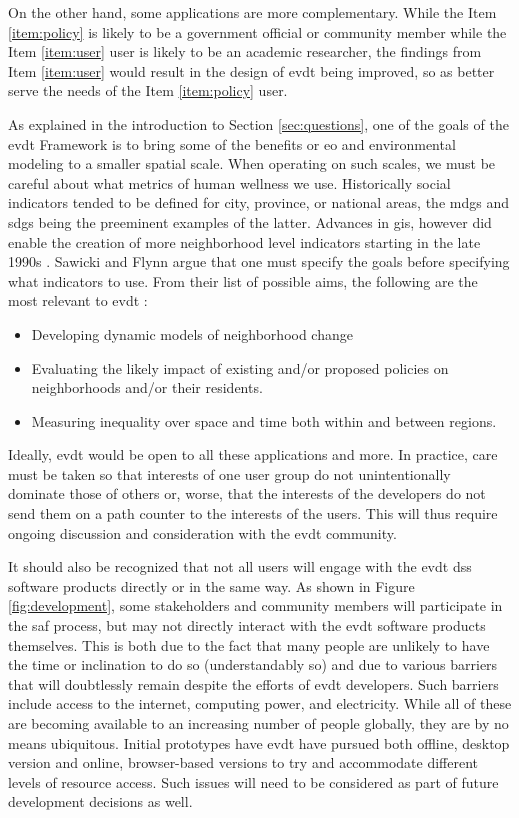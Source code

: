 On the other hand, some applications are more complementary. While the Item \ref{item:policy} is likely to be a government official or community member while the Item \ref{item:user} user is likely to be an academic researcher, the findings from Item \ref{item:user} would result in the design of \ac{evdt} being improved, so as better serve the needs of the Item \ref{item:policy} user.

As explained in the introduction to Section \ref{sec:questions}, one of the goals of the \ac{evdt} Framework is to bring some of the benefits or \ac{eo} and environmental modeling to a smaller spatial scale. When operating on such scales, we must be careful about what metrics of human wellness we use. Historically social indicators tended to be defined for city, province, or national areas, the \acp{mdg} and \acp{sdg} being the preeminent examples of the latter. Advances in \ac{gis}, however did enable the creation of more neighborhood level indicators starting in the late 1990s \cite{sawickiNeighborhoodIndicatorsReview1996}. Sawicki and Flynn argue that one must specify the goals before specifying what indicators to use. From their list of possible aims, the following are the most relevant to \ac{evdt} \cite{sawickiNeighborhoodIndicatorsReview1996}:

\begin{itemize}[itemsep=0pt,parsep=0pt]
	\item{Developing dynamic models of neighborhood change}
	\item{Evaluating the likely impact of existing and/or proposed policies on neighborhoods and/or their residents.}
	\item{Measuring inequality over space and time both within and between regions.}
\end{itemize}

Ideally, \ac{evdt} would be open to all these applications and more. In practice, care must be taken so that interests of one user group do not unintentionally dominate those of others or, worse, that the interests of the developers do not send them on a path counter to the interests of the users. This will thus require ongoing discussion and consideration with the \ac{evdt} community.

It should also be recognized that not all users will engage with the \ac{evdt} \ac{dss} software products directly or in the same way. As shown in Figure \ref{fig:development}, some stakeholders and community members will participate in the \ac{saf} process, but may not directly interact with the \ac{evdt} software products themselves. This is both due to the fact that many people are unlikely to have the time or inclination to do so (understandably so) and due to various barriers that will doubtlessly remain despite the efforts of \ac{evdt} developers. Such barriers include access to the internet, computing power, and electricity. While all of these are becoming available to an increasing number of people globally, they are by no means ubiquitous. Initial prototypes have \ac{evdt} have pursued both offline, desktop version and online, browser-based versions to try and accommodate different levels of resource access. Such issues will need to be considered as part of future development decisions as well.

